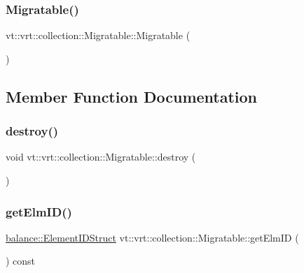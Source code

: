\subsubsection{\texorpdfstring{Migratable()}{Migratable()}}
{\footnotesize\ttfamily vt\+::vrt\+::collection\+::\+Migratable\+::\+Migratable (\begin{DoxyParamCaption}{ }\end{DoxyParamCaption})}



\subsection{Member Function Documentation}
\mbox{\label{structvt_1_1vrt_1_1collection_1_1_migratable_a31effa8f54013d1a1794cd025c24e410}} 
\subsubsection{\texorpdfstring{destroy()}{destroy()}}
{\footnotesize\ttfamily void vt\+::vrt\+::collection\+::\+Migratable\+::destroy (\begin{DoxyParamCaption}{ }\end{DoxyParamCaption})\hspace{0.3cm}{\ttfamily [virtual]}}

\mbox{\label{structvt_1_1vrt_1_1collection_1_1_migratable_a1b074bbe076e5eb0f83141e4b4504afe}} 
\subsubsection{\texorpdfstring{get\+Elm\+I\+D()}{getElmID()}}
{\footnotesize\ttfamily \hyperlink{namespacevt_1_1vrt_1_1collection_1_1balance_a9f5b53fafb270212279a4757d2c4cd28}{balance\+::\+Element\+I\+D\+Struct} vt\+::vrt\+::collection\+::\+Migratable\+::get\+Elm\+ID (\begin{DoxyParamCaption}{ }\end{DoxyParamCaption}) const\hspace{0.3cm}{\ttfamily [inline]}}

